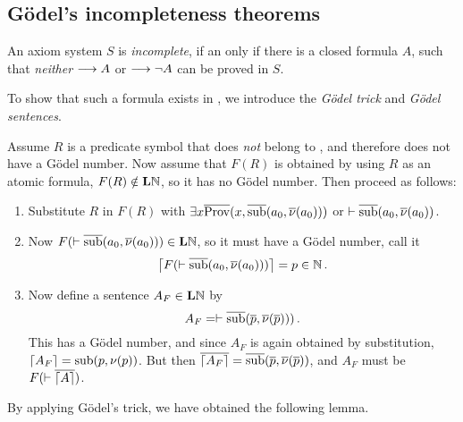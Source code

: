 \documentclass[11pt,a4paper]{article}
\begin{document}
\subsection{Gödel's incompleteness theorems}

\begin{definition}[Incompleteness]\label{def:incompleteness}
    An axiom system \(S\) is \emph{incomplete},
    if an only if there is a closed formula \(A\),
    such that \emph{neither} \(\seq A\) or \(\seq\lnot A\)
    can be proved in \(S\).
\end{definition}

To show that such a formula exists in \LN,
we introduce the \emph{Gödel trick} and \emph{Gödel sentences}.

\begin{definition}\label{def:Gödel trick}
    Assume \(R\) is a predicate symbol that does
    \emph{not} belong to \LN, and therefore does
    not have a Gödel number. Now assume that \(F(R)\)
    is obtained by using \(R\) as an atomic formula,
    \(F(R)\notin\LN\), so it has no Gödel number.
    Then proceed as follows:
    \begin{enumerate}
        \item
            Substitute \(R\) in \(F(R)\) with
            \(\exists x\num\Prov(x, \num\sub(a_0, \num\nu(a_0)))\)
            or \(\vdash\num\sub(a_0,\num\nu(a_0))\).
        \item
            Now \(F(\vdash\num\sub(a_0,\num\nu(a_0)))\in\LN\),
            so it must have a Gödel number, call it
            \begin{equation*}
                \G*{F(\vdash\num\sub(a_0,\num\nu(a_0)))} = p\in\Nset\,.
            \end{equation*}
        \item
            Now define a sentence \(A_F\in\LN\) by
            \begin{equation*}
            A_F = \vdash\num\sub(\num p,\num\nu(\num p))) \,.
            \end{equation*}
            This has a Gödel number, and since \(A_F\) is again obtained
            by substitution, \(\G{A_F} = \sub(p,\nu(p))\).
            But then \(\num{\G{A_F}} = \num\sub(\num p,\num\nu(\num p))\),
            and \(A_F\) must be \(F(\vdash\num{\G{A}})\).
    \end{enumerate}
\end{definition}

By applying Gödel's trick, we have obtained the following lemma.
\end{document}
